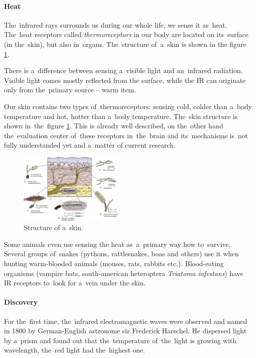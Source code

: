 \paragraph{Heat}
The~infrared rays surrounds us during our whole life, we sense it as~heat. The~heat receptors called
{\it thermoreceptors} in our body are located on its~surface (in the~skin), but also in~organs.
The~structure of~a~skin is shown in the figure \ref{fig:skin}. 

There is a~difference between sensing a~visible light and an~infrared radiation. Visible light comes
mostly reflected from the surface, while the IR can originate only from the~primary source -- warm item.

Our skin contains two types of~thermoreceptors: sensing cold, colder than a~body temperature and
hot, hotter than a~body temperature. The~skin structure is shown in~the~figure \ref{fig:skin}.
This is already well described, on the~other hand the~evaluation center of~these receptors in~the~brain
and its~mechanisms is~not fully understanded yet and a~matter of current research. \cite{BodilySenses}

\begin{figure}[h!]
\begin{center}
\includegraphics[width=0.45\textwidth]{img/skin.jpg}
\caption{Structure of a~skin. \cite{SkinStructure}\label{fig:skin}}
\end{center}    
\end{figure}

Some animals even use sensing the heat as~a~primary way how to~survive. Several groups of~snakes
(pythons, rattlesnakes, boas and others) use it when hunting warm-blooded animals (mouses, rats, rabbits etc.).
Blood-eating organisms (vampire bats, south-american heteroptera {\it Triatoma infestans})
have IR receptors to~look for a~vein under the skin.\cite{SnakeInfrared}


\paragraph{Discovery}
For the~first time, the~infrared electromagnetic waves were observed and named in 1800 by German-English
astronome sir Frederick Harschel. He dispersed light by a~prism and found out that the~temperature
of~the~light is growing with wavelength, the~red light had the~highest one.

